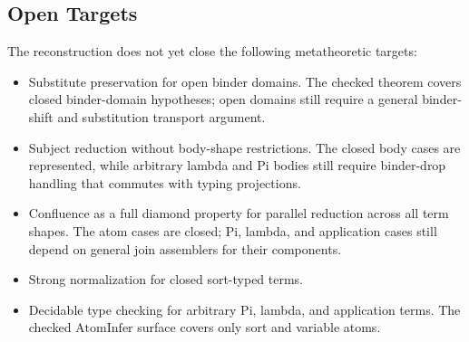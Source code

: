 \subsection{Open Targets}\label{subsec:reconstruction-open-targets}

The reconstruction does not yet close the following metatheoretic targets:
\begin{itemize}
  \item Substitute preservation for open binder domains. The checked theorem
    covers closed binder-domain hypotheses; open domains still require a
    general binder-shift and substitution transport argument.
  \item Subject reduction without body-shape restrictions. The closed body
    cases are represented, while arbitrary lambda and Pi bodies still require
    binder-drop handling that commutes with typing projections.
  \item Confluence as a full diamond property for parallel reduction across
    all term shapes. The atom cases are closed; Pi, lambda, and application
    cases still depend on general join assemblers for their components.
  \item Strong normalization for closed sort-typed terms.
  \item Decidable type checking for arbitrary Pi, lambda, and application
    terms. The checked $\mathrm{AtomInfer}$ surface covers only sort and
    variable atoms.
\end{itemize}
